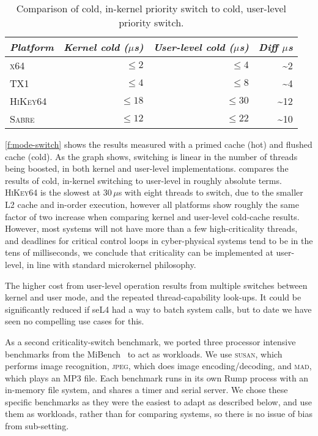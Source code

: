\begin{table}[t]\centering
    \begin{tabular}{lrrr}\toprule
        \emph{Platform}     & \emph{Kernel cold ($\mu$s)} & \emph{User-level cold ($\mu$s)} & \emph{Diff $\mu$s} \\\midrule
        \textsc{x64}    & $\leq2$ & $\leq4$ & \textasciitilde2 \\
        \textsc{TX1}    & $\leq4$ & $\leq8$ & \textasciitilde4 \\
        \textsc{HiKey64}    & $\leq18$ & $\leq30$ & \textasciitilde12 \\
        \textsc{Sabre}    & $\leq12$ & $\leq22$ & \textasciitilde10 \\
        \bottomrule
\end{tabular}
\caption[Comparison of kernel and user-level priority switches]{Comparison of cold, in-kernel
priority switch to cold, user-level priority switch.}
\label{t:cold-prio-switch}
\end{table}


\autoref{f:mode-switch} shows the results measured with a primed cache (hot) and flushed cache (cold).
As the graph shows, switching is linear in the number of threads being boosted, in both kernel and
user-level implementations.
 compares the results of cold, in-kernel switching to user-level in roughly
absolute terms. \textsc{HiKey64} is the slowest at 30\,\(\mu\)s with eight threads to switch,
due to the smaller L2 cache and
in-order execution, however all platforms show roughly the same factor of two increase when
comparing kernel and user-level cold-cache results.
However, most systems will not have more than a few high-criticality threads, and deadlines for critical control loops in
cyber-physical systems tend to be in the tens of milliseconds, we
conclude that criticality can be implemented at user-level, in line with standard microkernel philosophy.

The higher cost from user-level operation results from  multiple
switches between kernel and user mode, and the repeated
thread-capability look-ups. It could be significantly reduced if seL4
had a way to batch system calls, but to date we have seen no compelling use cases for this.

As a second criticality-switch benchmark, we ported three processor intensive 
benchmarks from the MiBench~\citep{Guthaus_REAMB_01} to act as workloads. 
We use \textsc{susan}, which performs image recognition, \textsc{jpeg}, which does image
encoding/decoding, and \textsc{mad}, which plays an MP3 file.
Each benchmark runs in its own Rump process
with an in-memory file system, and shares a timer and serial server.
 We chose these specific
benchmarks as they were the easiest to adapt as described below, and use them as workloads,
rather than for comparing systems, so there is no issue of bias from sub-setting.

